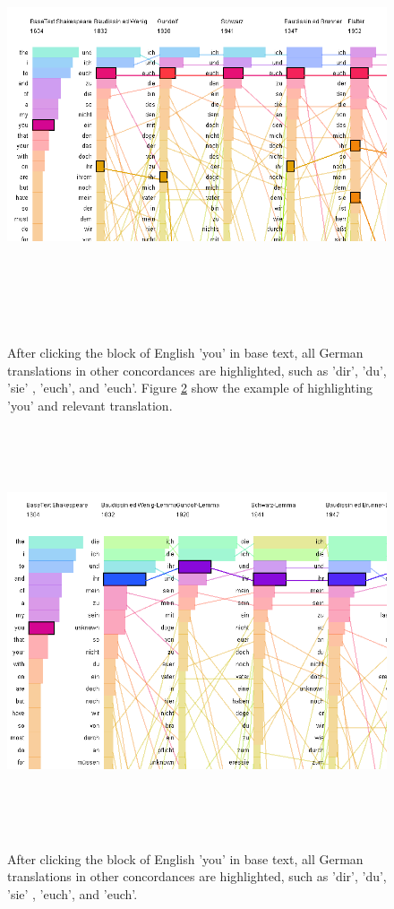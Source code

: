 \begin{figure}[h]
	\centering	
	\includegraphics[width=16cm, height=12cm]{Figs/You-In-Frequency}\\[1ex]
	\caption{} After clicking the block of English 'you' in base text, all German translations in other concordances are highlighted, such as  'dir', 'du', 'sie' , 'euch', and 'euch'. Figure \ref{fig:youInLemma} show the example of highlighting 'you' and relevant translation.
	\label{fig:youInFreq}
\end{figure} 
\begin{figure}[h]
	\centering	
	\includegraphics[width=16cm, height=12cm]{Figs/You-In-Lemma}\\[1ex]
	\caption{} After clicking the block of English 'you' in base text, all German translations in other concordances are highlighted, such as  'dir', 'du', 'sie' , 'euch', and 'euch'.
	\label{fig:youInLemma}
\end{figure} 

